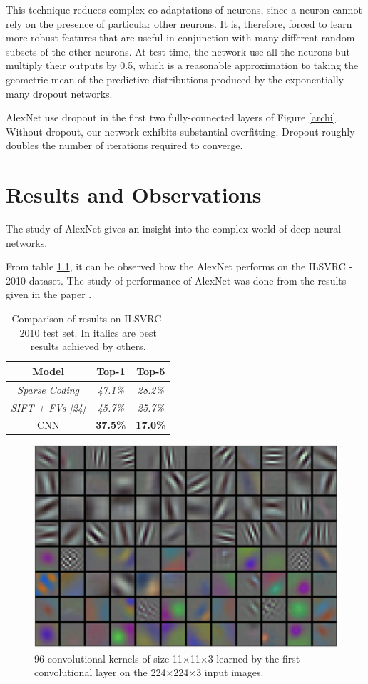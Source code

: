 \documentclass[11pt]{report}
\begin{document}
This technique reduces complex co-adaptations of neurons,
since a neuron cannot rely on the presence of particular other neurons. It is, therefore, forced to
learn more robust features that are useful in conjunction with many different random subsets of the
other neurons. At test time, the network use all the neurons but multiply their outputs by 0.5, which is a reasonable approximation to taking the geometric mean of the predictive distributions produced by the exponentially-many dropout networks. 

AlexNet use dropout in the first two fully-connected layers of Figure \ref{archi}. Without dropout, our network exhibits substantial overfitting. Dropout roughly doubles the number of iterations required to converge.

\chapter{Results and Observations}
The study of AlexNet gives an insight into the complex world of deep neural networks.

From table \ref{tab}, it can be observed how the AlexNet performs on the ILSVRC - 2010 dataset. The study of performance of AlexNet was done from the results given in the paper \citep{one}.
		\begin{table}[!h]
		\begin{tabular}{||c| c| c||} 
	 	\hline
 		\textbf{Model} & \textbf{Top-1} & \textbf{Top-5} \\ [0.5ex] 
 		\hline\hline
 		\textit{Sparse Coding} & \textit{47.1\%} & \textit{28.2\%}\\ 
 		\hline
 		\textit{SIFT + FVs [24]} & \textit{45.7\%} & \textit{25.7\%} \\
 		\hline
 		CNN & \textbf{37.5\%} & \textbf{17.0\%}\\
 		\hline
 	\end{tabular}
 	\centering
 	\caption{Comparison of results on ILSVRC-2010 test set. In italics are best results
achieved by others.}
\label{tab}
	\end{table}

\newpage

\begin{figure}[!h]
	\includegraphics[scale=0.3]{learning.png}
	\centering 
	\caption{96 convolutional kernels of size
11×11×3 learned by the first convolutional
layer on the 224×224×3 input images.}
	\label{learn}
\end{figure}
\end{document}
